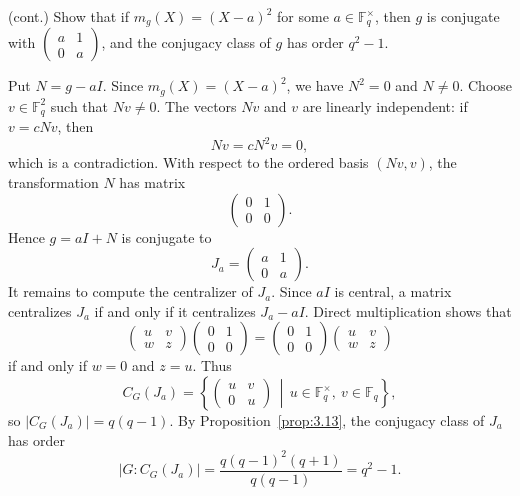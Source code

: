 \documentclass[../Odyssey_Project.tex]{subfiles}
\begin{document}
\begin{exercise}
\label{ex:16.10}
(cont.) Show that if $m_g(X) = (X - a)^2$ for some $a \in \mathbb{F}_q^\times$, then $g$ is conjugate with $\begin{pmatrix} a & 1 \\ 0 & a \end{pmatrix}$, and the conjugacy class of $g$ has order $q^2 - 1$.
\end{exercise}
\begin{solution}
    Put $N=g-aI$. Since $m_g(X)=(X-a)^2$, we have $N^2=0$ and $N\neq0$. Choose $v\in\mathbb{F}_q^2$ such that $Nv\neq0$. The vectors $Nv$ and $v$ are linearly independent: if $v=cNv$, then
    \[
        Nv=cN^2v=0,
    \]
    which is a contradiction. With respect to the ordered basis $(Nv,v)$, the transformation $N$ has matrix
    \[
        \begin{pmatrix}
            0&1\\
            0&0
        \end{pmatrix}.
    \]
    Hence $g=aI+N$ is conjugate to
    \[
        J_a=
        \begin{pmatrix}
            a&1\\
            0&a
        \end{pmatrix}.
    \]
    It remains to compute the centralizer of $J_a$. Since $aI$ is central, a matrix centralizes $J_a$ if and only if it centralizes $J_a-aI$. Direct multiplication shows that
    \[
        \begin{pmatrix}
            u&v\\
            w&z
        \end{pmatrix}
        \begin{pmatrix}
            0&1\\
            0&0
        \end{pmatrix}
        =
        \begin{pmatrix}
            0&1\\
            0&0
        \end{pmatrix}
        \begin{pmatrix}
            u&v\\
            w&z
        \end{pmatrix}
    \]
    if and only if $w=0$ and $z=u$. Thus
    \[
        C_G(J_a)
        =
        \left\{
        \begin{pmatrix}
            u&v\\
            0&u
        \end{pmatrix}
        \,\middle|\,
        u\in\mathbb{F}_q^\times,\ v\in\mathbb{F}_q
        \right\},
    \]
    so $|C_G(J_a)|=q(q-1)$. By Proposition~\ref{prop:3.13}, the conjugacy class of $J_a$ has order
    \[
        |G : C_G(J_a)|
        =
        \frac{q(q-1)^2(q+1)}{q(q-1)}
        =
        q^2-1.
    \]
\end{solution}
\end{document}
